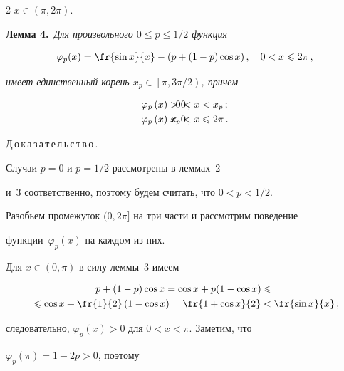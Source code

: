 \begin{multicols}{2}
$x\in(\pi,2\pi)$.



\medskip



\noindent

\textbf{Лемма 4.}\ \textit{Для произвольного $0\le p\le 1/2$ функция}

$$

\varphi_p(x)=\fr{\sin x}{x}-(p+(1-p)\cos x)\,,\quad 0<x\le2\pi\,,

$$

\textit{имеет единственный корень $x_p\in\left[\pi,3\pi/2\right)$, причем}

\begin{align*}

 \varphi_p\,(x)&>0\,, &\hspace*{-30pt}  0&<x<x_p\,; \\

  \varphi_p\,(x)&<0\,, &\hspace*{-30pt} x_p&<x\le2\pi\,.

\end{align*}



\medskip



\noindent

Д\,о\,к\,а\,з\,а\,т\,е\,л\,ь\,с\,т\,в\,о\,.\

Случаи $p=0$ и $p=1/2$ рассмотрены в леммах~2

и~3 соответственно, поэтому будем считать, что $0<p<1/2.$

Разобьем промежуток $(0,2\pi]$ на три части и рассмотрим поведение

функции~$\varphi_p(x)$ на каждом из них.



Для $x\in(0,\pi)$ в силу леммы~3 имеем

\begin{multline*}

p+(1-p)\cos x=\cos x+p(1-\cos x)\le{}\\

{}\le

\cos x+\fr {1}{2}\left( 1-\cos x\right )=

\fr{1+\cos x}{2}<\fr{\sin x}{x}\,;

\end{multline*}

следовательно, $\varphi_p(x)>0$ для $0<x<\pi.$ Заметим, что

$\varphi_p(\pi)=1-2p>0$, поэтому


\end{multicols}
